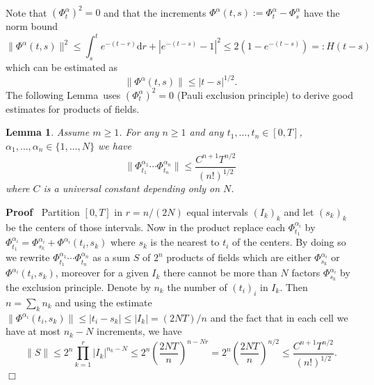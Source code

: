 \documentclass{article}
\newcommand{\assign}{:=}
\newcommand{\backassign}{=:}
\newcommand{\mathd}{\mathrm{d}}
\newenvironment{proof}{\noindent\textbf{Proof\ }}{\hspace*{\fill}$\Box$\medskip}
\newtheorem{lemma}[theorem]{Lemma}
\begin{document}
\

Note that $(\Phi^{\alpha}_t)^2 = 0$ and that the increments $\Phi^{\alpha}
(t, s) \assign \Phi^{\alpha}_t - \Phi^{\alpha}_s$ have the norm bound
\[ \| \Phi^{\alpha} (t, s) \|^2 \leqslant \int_s^t e^{- (t - r)} \mathd r + |
   e^{- (t - s)} - 1 |^2 \leqslant 2 (1 - e^{- (t - s)}) \backassign H (t - s)
\]
which can be estimated as
\[ \| \Phi^{\alpha} (t, s) \| \leqslant | t - s |^{1 / 2} . \]
The following Lemma~uses $(\Phi^{\alpha}_t)^2 = 0$ (Pauli exclusion principle)
to derive good estimates for products of fields.

\begin{lemma}
  Assume $m \geqslant 1$. For any $n \geqslant 1$ and any $t_1, \ldots, t_n
  \in [0, T]$, $\alpha_1, \ldots, \alpha_n \in \{ 1, \ldots, N \}$ we have
  \[ \| \Phi^{\alpha_1}_{t_1} \cdots \Phi^{\alpha_n}_{t_n} \| \leqslant
     \frac{C^{n + 1} T^{n / 2}}{(n!)^{1 / 2}} \]
  where $C$ is a universal constant depending only on $N$.
\end{lemma}

\begin{proof}
  Partition $[0, T]$ in $r = n / (2 N)$ equal intervals $(I_k)_k$ and let
  $(s_k)_k$ be the centers of those intervals. Now in the product replace each
  $\Phi^{\alpha_i}_{t_1}$ by $\Phi^{\alpha_i}_{t_1} = \Phi^{\alpha_i}_{s_k} +
  \Phi^{\alpha_i} (t_i, s_k)$ where $s_k$ is the nearest to $t_i$ of the
  centers. By doing so we rewrite $\Phi^{\alpha_1}_{t_1} \cdots
  \Phi^{\alpha_n}_{t_n}$ as a sum $S$ of $2^n$ products of fields which are
  either $\Phi^{\alpha_i}_{s_k}$ or \ $\Phi^{\alpha_i} (t_i, s_k)$, moreover
  for a given $I_k$ there cannot be more than $N$ factors
  $\Phi^{\alpha_i}_{s_k}$ by the exclusion principle. Denote by $n_k$ the
  number of $(t_i)_i$ in $I_k$. Then $n = \sum_k n_k$ and using the estimate
  $\| \Phi^{\alpha_i} (t_i, s_k) \| \leqslant | t_i - s_k | \leqslant | I_k |
  = (2 N T) / n$ and the fact that in each cell we have at most $n_k - N$
  increments, we have
  \[ \| S \| \leqslant 2^n \prod_{k = 1}^r | I_k |^{n_k - N} \leqslant 2^n
     \left( \frac{2 N T}{n} \right)^{n - N r} = 2^n \left( \frac{2 N T}{n}
     \right)^{n / 2} \leqslant \frac{C^{n + 1} T^{n / 2}}{(n!)^{1 / 2}} . \]
\end{proof}
\end{document}
